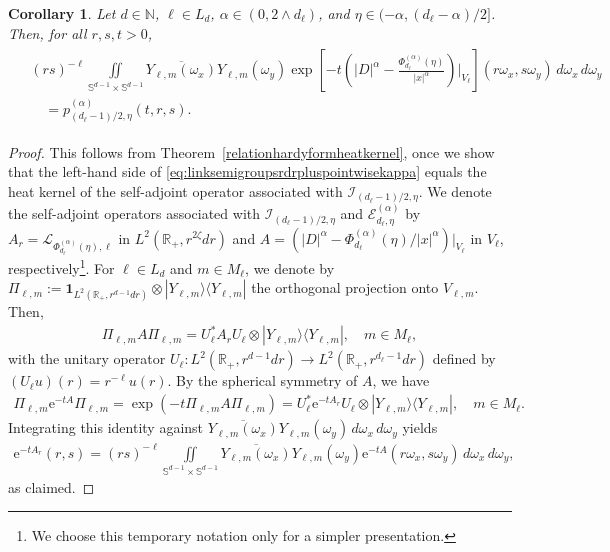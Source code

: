 \documentclass[12pt,reqno]{amsart}
\newtheorem{corollary}[theorem]{Corollary}
\theoremstyle{definition}
\theoremstyle{remark}
\numberwithin{equation}{section}
\newcommand{\1}{\mathbbm{1}}
\newcommand{\N}{\mathbb{N}}
\newcommand{\R}{\mathbb{R}}
\def\bs{\mathbb{S}}
\def\ce{\mathcal{E}}
\def\ci{\mathcal{I}}
\def\cl{\mathcal{L}}
\newcommand{\me}[1]{\mathrm{e}^{#1}}
\newcommand{\one}{\mathbf{1}}
\begin{document}
\begin{corollary}
  \label{heatkernelintegratedsphericalharmonic}
  Let $d\in\N$, $\ell\in L_d$, $\alpha\in(0,2\wedge d_\ell)$, and $\eta\in(-\alpha,(d_\ell-\alpha)/2]$. Then, for all $r,s,t>0$,
  \begin{align}
    \label{eq:linksemigroupsrdrpluspointwisekappa}
    \begin{split}
    & (rs)^{-\ell} \!\!\!\!\!\iint\limits_{\bs^{d-1}\times\bs^{d-1}} \overline{Y_{\ell,m}(\omega_x)} Y_{\ell,m}(\omega_y) \exp\left[-t\left(|D|^\alpha-\frac{\Phi_{d_\ell}^{(\alpha)}(\eta)}{|x|^\alpha}\right)\Big|_{V_\ell}\right](r\omega_x,s\omega_y)\,d\omega_x\,d\omega_y \\
    & \quad = p_{(d_\ell-1)/2,\eta}^{(\alpha)}(t,r,s).
    \end{split}
  \end{align}
\end{corollary}

\begin{proof}
  This follows from Theorem~\ref{relationhardyformheatkernel}, once we show that the left-hand side of \eqref{eq:linksemigroupsrdrpluspointwisekappa} equals the heat kernel of the self-adjoint operator associated with $\ci_{(d_\ell-1)/2,\eta}$. We denote the self-adjoint operators associated with $\ci_{(d_\ell-1)/2,\eta}$ and $\ce_{d_\ell,\eta}^{(\alpha)}$ by $A_r\!=\!\cl_{\Phi_{d_\ell}^{(\alpha)}(\eta),\ell}$ in $L^2(\R_+,r^{2\zeta}dr)$ and $A=\left(|D|^\alpha-\Phi_{d_\ell}^{(\alpha)}(\eta)/|x|^\alpha\right)|_{V_\ell}$ in $V_\ell$, respectively\footnote{We choose this temporary notation only for a simpler presentation.}. For $\ell\in L_d$ and $m\in M_\ell$, we denote by
  $\Pi_{\ell,m}:=\one_{L^2(\R_+,r^{d-1}dr)}\otimes |Y_{\ell,m}\rangle\langle Y_{\ell,m}|$ the orthogonal projection onto $V_{\ell,m}$. Then,
  \begin{align}
    \Pi_{\ell,m} A \Pi_{\ell,m}
    = U_\ell^* A_rU_\ell \otimes |Y_{\ell,m}\rangle\langle Y_{\ell,m}|, \quad m\in M_\ell,
  \end{align}
  with the unitary operator $U_\ell:L^2(\R_+,r^{d-1}dr)\to L^2(\R_+,r^{d_\ell-1}dr)$ defined by $(U_\ell u)(r)=r^{-\ell}u(r)$. By the spherical symmetry of $A$, we have
  \begin{align}
    \Pi_{\ell,m} \me{-tA} \Pi_{\ell,m}
    = \exp\left(-t \Pi_{\ell,m} A \Pi_{\ell,m}\right)
    = U_\ell^* \me{-tA_r}U_\ell \otimes |Y_{\ell,m}\rangle\langle Y_{\ell,m}|,
    \quad m\in M_\ell.
  \end{align}
  Integrating this identity against $\overline{Y_{\ell,m}(\omega_x)} Y_{\ell,m}(\omega_y)\,d\omega_x\,d\omega_y$ yields
  \begin{align}
    \me{-tA_r}(r,s)
    = (rs)^{-\ell} \iint\limits_{\bs^{d-1}\times\bs^{d-1}} \overline{Y_{\ell,m}(\omega_x)} Y_{\ell,m}(\omega_y) \me{-tA}(r\omega_x,s\omega_y)\,d\omega_x\,d\omega_y,
  \end{align}
  as claimed.
\end{proof}
\end{document}
